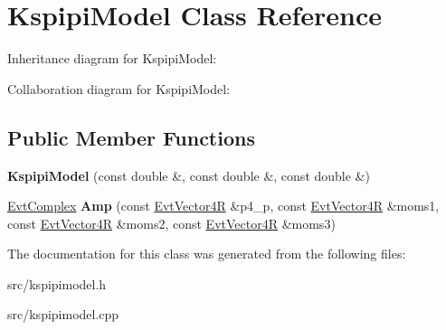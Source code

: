 \hypertarget{class_kspipi_model}{}\section{Kspipi\+Model Class Reference}
\label{class_kspipi_model}


Inheritance diagram for Kspipi\+Model\+:


Collaboration diagram for Kspipi\+Model\+:
\subsection*{Public Member Functions}
\begin{DoxyCompactItemize}
\item 
\hypertarget{class_kspipi_model_aa3b12f8dca5ef24e65f9369fee3c6f4c}{}{\bfseries Kspipi\+Model} (const double \&, const double \&, const double \&)\label{class_kspipi_model_aa3b12f8dca5ef24e65f9369fee3c6f4c}

\item 
\hypertarget{class_kspipi_model_aca6fe48ba8a60812386ef32d664f3803}{}\hyperlink{class_evt_complex}{Evt\+Complex} {\bfseries Amp} (const \hyperlink{class_evt_vector4_r}{Evt\+Vector4\+R} \&p4\+\_\+p, const \hyperlink{class_evt_vector4_r}{Evt\+Vector4\+R} \&moms1, const \hyperlink{class_evt_vector4_r}{Evt\+Vector4\+R} \&moms2, const \hyperlink{class_evt_vector4_r}{Evt\+Vector4\+R} \&moms3)\label{class_kspipi_model_aca6fe48ba8a60812386ef32d664f3803}

\end{DoxyCompactItemize}


The documentation for this class was generated from the following files\+:\begin{DoxyCompactItemize}
\item 
src/kspipimodel.\+h\item 
src/kspipimodel.\+cpp\end{DoxyCompactItemize}

